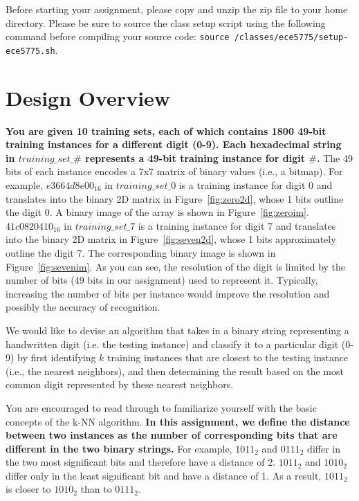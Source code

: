 \documentclass[paper=letter, fontsize=10pt]{scrartcl} %
\numberwithin{equation}{section} %
\numberwithin{figure}{section} %
\numberwithin{table}{section} %
\begin{document}
Before starting your assignment, please copy and unzip the zip file to your home directory. Please be sure to source the class setup script using the following command before compiling your source code: \texttt{source /classes/ece5775/setup-ece5775.sh}. 

\section{Design Overview}

\textbf{You are given 10 training sets, each of which contains 1800 49-bit training instances for a different digit (0-9). Each hexadecimal string in $training\_set\_\#$ represents a 49-bit training instance for digit $\#$.} 
The 49 bits of each instance encodes a 7x7 matrix of binary values (i.e., a bitmap). For example, \texttt{$e3664d8e00_{16}$} in $training\_set\_0$ is a training instance for digit 0 and translates into the binary 2D matrix in Figure~\ref{fig:zero2d}, whose 1 bits outline the digit 0. A binary image of the array is shown in Figure~\ref{fig:zeroim}. \texttt{$41c0820410_{16}$} in $training\_set\_7$ is a training instance for digit 7 and translates into the binary 2D matrix in Figure~\ref{fig:seven2d}, whose 1 bits approximately outline the digit 7. The corresponding binary image is shown in Figure~\ref{fig:sevenim}. As you can see, the resolution of the digit is limited by the number of bits (49 bits in our assignment) used to represent it. Typically, increasing the number of bits per instance would improve the resolution and possibly the accuracy of recognition. 

We would like to devise an algorithm that takes in a binary string representing a handwritten digit (i.e. the testing instance) and classify it to a particular digit (0-9) by first identifying $k$ training instances that are closest to the testing instance (i.e., the nearest neighbors), and then determining the result based on the most common digit represented by these nearest neighbors. 

You are encouraged to read through \cite{knn} to familiarize yourself with the basic concepts of the k-NN algorithm. \textbf{In this assignment, we define the distance between two instances as the number of corresponding bits that are different in the two binary strings.} For example, $1011_2$ and $0111_2$ differ in the two most significant bits and therefore have a distance of 2. $1011_2$ and $1010_2$ differ only in the least significant bit and have a distance of 1. As a result, $1011_2$ is closer to $1010_2$ than to $0111_2$. %
\end{document}
